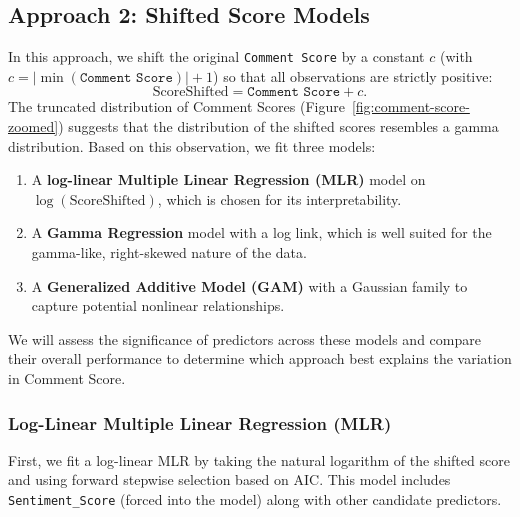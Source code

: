 \documentclass[10pt]{article}
\begin{document}
\subsection{Approach 2: Shifted Score Models}
In this approach, we shift the original \texttt{Comment Score} by a constant \(c\) (with 
\(c = |\min(\texttt{Comment Score})| + 1\)) so that all observations are strictly positive:
\[
\text{ScoreShifted} = \texttt{Comment Score} + c.
\]
The truncated distribution of Comment Scores (Figure~\ref{fig:comment-score-zoomed}) suggests that the distribution of the shifted scores resembles a gamma distribution. Based on this observation, we fit three models:
\begin{enumerate}
  \item A \textbf{log-linear Multiple Linear Regression (MLR)} model on \(\log(\text{ScoreShifted})\), which is chosen for its interpretability.
  \item A \textbf{Gamma Regression} model with a log link, which is well suited for the gamma-like, 
  right-skewed nature of the data.
  \item A \textbf{Generalized Additive Model (GAM)} with a Gaussian family to capture potential nonlinear relationships.
\end{enumerate}

\noindent We will assess the significance of predictors across these models and compare their overall performance to determine which approach best explains the variation in Comment Score.

\subsubsection{Log-Linear Multiple Linear Regression (MLR)}
First, we fit a log-linear MLR by taking the natural logarithm of the shifted score and using forward stepwise 
selection based on AIC. This model includes \texttt{Sentiment\_Score} (forced into the model) along with other candidate predictors.
\end{document}
